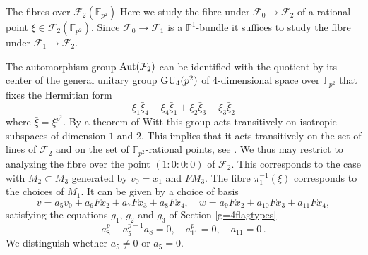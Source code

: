 \documentclass[11pt]{amsart}
\numberwithin{equation}{section}
\newcommand{\FF}{\mathbb F}
\newcommand{\PP}{\mathbb P}
\theoremstyle{definition}
\theoremstyle{remark}
\begin{document}
\begin{section}{The fibres over $\mathcal{F}_2({\FF}_{p^2})$}
Here we study the fibre under $\mathcal{F}_0 \to \mathcal{F}_2$ 
of a rational point $\xi \in \mathcal{F}_2({\FF}_{p^2})$. 
Since $\mathcal{F}_0 \to \mathcal{F}_1$ is a ${\PP}^1$-bundle it suffices to study
the fibre under $\mathcal{F}_1 \to \mathcal{F}_2$.

The automorphism group ${\rm Aut}(\mathcal{F}_2)$ can be identified with the
quotient by its center of the general unitary group ${\rm GU}_4(p^2)$ of 
$4$-dimensional space 
over ${\FF}_{p^2}$ that fixes the Hermitian form
$$
\xi_1 \bar{\xi}_4-\xi_4\bar{\xi}_1+\xi_2\bar{\xi}_3-\xi_3\bar{\xi}_2
$$
where $\bar{\xi}=\xi^{p^2}$. By a theorem of Witt this group acts transitively
on isotropic subspaces of dimension $1$ and $2$. 
This implies that it acts transitively on the set of
lines of $\mathcal{F}_2$ and on the set of ${\FF}_{p^2}$-rational points, see \cite[Appendix]{K2017}.
We thus may restrict to analyzing the fibre over the point $(1:0:0:0)$ of $\mathcal{F}_2$.
This corresponds to the case with $M_2\subset M_3$ generated by $v_0=x_1$ and
$FM_3$. The fibre $\pi_1^{-1}(\xi)$ corresponds to the choices of $M_1$.
It can be given by a choice of basis
$$
v=a_5v_0+a_6Fx_2+a_7Fx_3+a_8Fx_4, \quad w= a_9Fx_2+a_{10}Fx_3+a_{11}Fx_4,
$$
satisfying the equations $g_1$, $g_2$ and $g_3$ of Section \ref{g=4flagtypes}
$$
a_8^p-a_5^{p-1}a_8=0, \quad a_{11}^p=0, \quad a_{11}=0 \, .
$$
We distinguish whether $a_5\neq 0$ or $a_5=0$. 


\end{section}
\end{document}
